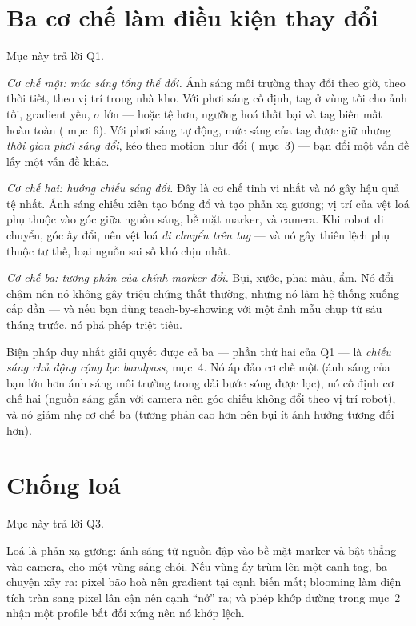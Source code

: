\documentclass[../../marker.tex]{subfiles}
\begin{document}
\section{Ba cơ chế làm điều kiện thay đổi}

Mục này trả lời Q1.

\emph{Cơ chế một: mức sáng tổng thể đổi.} Ánh sáng môi trường thay đổi theo giờ, theo thời tiết, theo vị trí trong nhà kho. Với phơi sáng cố định, tag ở vùng tối cho ảnh tối, gradient yếu, \(\sigma\) lớn --- hoặc tệ hơn, ngưỡng hoá thất bại và tag biến mất hoàn toàn ( mục~6). Với phơi sáng tự động, mức sáng của tag được giữ nhưng \emph{thời gian phơi sáng đổi}, kéo theo motion blur đổi ( mục~3) --- bạn đổi một vấn đề lấy một vấn đề khác.

\emph{Cơ chế hai: hướng chiếu sáng đổi.} Đây là cơ chế tinh vi nhất và nó gây hậu quả tệ nhất. Ánh sáng chiếu xiên tạo bóng đổ và tạo phản xạ gương; vị trí của vệt loá phụ thuộc vào góc giữa nguồn sáng, bề mặt marker, và camera. Khi robot di chuyển, góc ấy đổi, nên vệt loá \emph{di chuyển trên tag} --- và nó gây thiên lệch phụ thuộc tư thế, loại nguồn sai số khó chịu nhất.

\emph{Cơ chế ba: tương phản của chính marker đổi.} Bụi, xước, phai màu, ẩm. Nó đổi chậm nên nó không gây triệu chứng thất thường, nhưng nó làm hệ thống xuống cấp dần --- và nếu bạn dùng teach-by-showing với một ảnh mẫu chụp từ sáu tháng trước, nó phá phép triệt tiêu.

Biện pháp duy nhất giải quyết được cả ba --- phần thứ hai của Q1 --- là \emph{chiếu sáng chủ động cộng lọc bandpass}, mục~4. Nó áp đảo cơ chế một (ánh sáng của bạn lớn hơn ánh sáng môi trường trong dải bước sóng được lọc), nó cố định cơ chế hai (nguồn sáng gắn với camera nên góc chiếu không đổi theo vị trí robot), và nó giảm nhẹ cơ chế ba (tương phản cao hơn nên bụi ít ảnh hưởng tương đối hơn).

\section{Chống loá}

Mục này trả lời Q3.

Loá là phản xạ gương: ánh sáng từ nguồn đập vào bề mặt marker và bật thẳng vào camera, cho một vùng sáng chói. Nếu vùng ấy trùm lên một cạnh tag, ba chuyện xảy ra: pixel bão hoà nên gradient tại cạnh biến mất; blooming làm điện tích tràn sang pixel lân cận nên cạnh ``nở'' ra; và phép khớp đường trong  mục~2 nhận một profile bất đối xứng nên nó khớp lệch.
\end{document}
